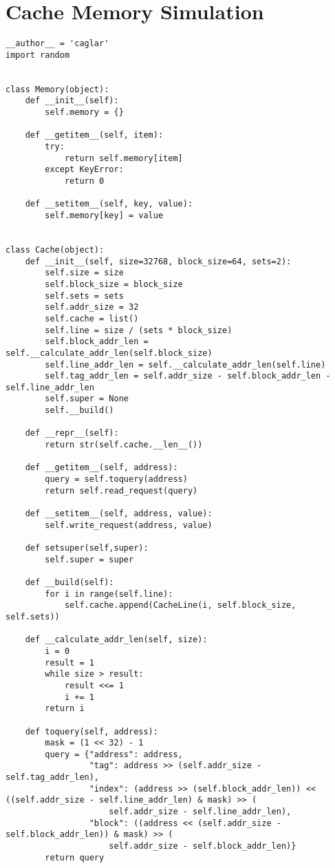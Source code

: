 \chapter{Cache Memory Simulation}
\begin{verbatim}
__author__ = 'caglar'
import random


class Memory(object):
    def __init__(self):
        self.memory = {}

    def __getitem__(self, item):
        try:
            return self.memory[item]
        except KeyError:
            return 0

    def __setitem__(self, key, value):
        self.memory[key] = value


class Cache(object):
    def __init__(self, size=32768, block_size=64, sets=2):
        self.size = size
        self.block_size = block_size
        self.sets = sets
        self.addr_size = 32
        self.cache = list()
        self.line = size / (sets * block_size)
        self.block_addr_len = self.__calculate_addr_len(self.block_size)
        self.line_addr_len = self.__calculate_addr_len(self.line)
        self.tag_addr_len = self.addr_size - self.block_addr_len - self.line_addr_len
        self.super = None
        self.__build()

    def __repr__(self):
        return str(self.cache.__len__())

    def __getitem__(self, address):
        query = self.toquery(address)
        return self.read_request(query)

    def __setitem__(self, address, value):
        self.write_request(address, value)

    def setsuper(self,super):
        self.super = super

    def __build(self):
        for i in range(self.line):
            self.cache.append(CacheLine(i, self.block_size, self.sets))

    def __calculate_addr_len(self, size):
        i = 0
        result = 1
        while size > result:
            result <<= 1
            i += 1
        return i

    def toquery(self, address):
        mask = (1 << 32) - 1
        query = {"address": address,
                 "tag": address >> (self.addr_size - self.tag_addr_len),
                 "index": (address >> (self.block_addr_len)) << ((self.addr_size - self.line_addr_len) & mask) >> (
                     self.addr_size - self.line_addr_len),
                 "block": ((address << (self.addr_size - self.block_addr_len)) & mask) >> (
                     self.addr_size - self.block_addr_len)}
        return query


\end{verbatim}
